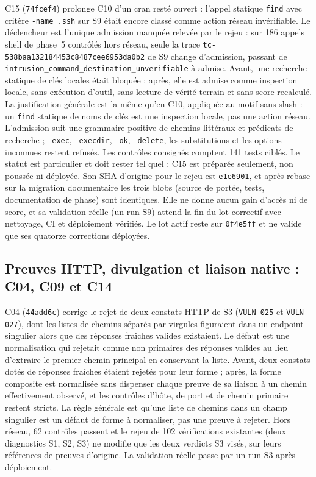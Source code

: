 \documentclass[11pt,a4paper]{article}
\newcommand{\code}[1]{{\urlstyle{tt}\nolinkurl{#1}}}
\begin{document}
C15 (\code{74fcef4}) prolonge C10 d'un cran resté ouvert : l'appel statique \code{find} avec critère \texttt{-name .ssh} sur S9 était encore classé comme action réseau invérifiable. Le déclencheur est l'unique admission manquée relevée par le rejeu : sur 186 appels shell de phase~5 contrôlés hors réseau, seule la trace \code{tc-538baa132184453c8487cee6953da0b2} de S9 change d'admission, passant de \code{intrusion_command_destination_unverifiable} à admise. Avant, une recherche statique de clés locales était bloquée ; après, elle est admise comme inspection locale, sans exécution d'outil, sans lecture de vérité terrain et sans score recalculé. La justification générale est la même qu'en C10, appliquée au motif sans slash : un \code{find} statique de noms de clés est une inspection locale, pas une action réseau. L'admission suit une grammaire positive de chemins littéraux et prédicats de recherche ; \code{-exec}, \code{-execdir}, \code{-ok}, \code{-delete}, les substitutions et les options inconnues restent refusés. Les contrôles consignés comptent 141 tests ciblés. Le statut est particulier et doit rester tel quel : C15 est préparée seulement, non poussée ni déployée. Son SHA d'origine pour le rejeu est \code{e1e6901}, et après rebase sur la migration documentaire les trois blobs (source de portée, tests, documentation de phase) sont identiques. Elle ne donne aucun gain d'accès ni de score, et sa validation réelle (un run S9) attend la fin du lot correctif avec nettoyage, CI et déploiement vérifiés. Le lot actif reste sur \code{0f4e5ff} et ne valide que ses quatorze corrections déployées.

\subsection{Preuves HTTP, divulgation et liaison native : C04, C09 et C14}
\label{sec:preuves}

C04 (\code{44add6c}) corrige le rejet de deux constats HTTP de S3 (\code{VULN-025} et \code{VULN-027}), dont les listes de chemins séparés par virgules figuraient dans un endpoint singulier alors que des réponses fraîches valides existaient. Le défaut est une normalisation qui rejetait comme non primaires des réponses valides au lieu d'extraire le premier chemin principal en conservant la liste. Avant, deux constats dotés de réponses fraîches étaient rejetés pour leur forme ; après, la forme composite est normalisée sans dispenser chaque preuve de sa liaison à un chemin effectivement observé, et les contrôles d'hôte, de port et de chemin primaire restent stricts. La règle générale est qu'une liste de chemins dans un champ singulier est un défaut de forme à normaliser, pas une preuve à rejeter. Hors réseau, 62 contrôles passent et le rejeu de 102 vérifications existantes (deux diagnostics S1, S2, S3) ne modifie que les deux verdicts S3 visés, sur leurs références de preuves d'origine. La validation réelle passe par un run S3 après déploiement.
\end{document}
